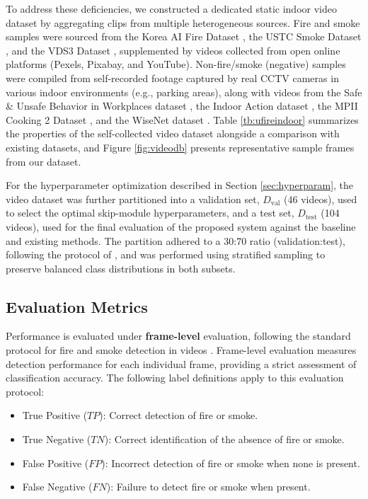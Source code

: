 \documentclass[
  10pt,
]{article}
\providecommand{\tightlist}{%
  \setlength{\itemsep}{0pt}\setlength{\parskip}{0pt}}
\begin{document}
To address these deficiencies, we constructed a dedicated static indoor
video dataset by aggregating clips from multiple heterogeneous sources.
Fire and smoke samples were sourced from the Korea AI Fire Dataset
, the USTC Smoke Dataset
, and the VDS3 Dataset
, supplemented by videos collected
from open online platforms (Pexels, Pixabay, and YouTube).
Non-fire/smoke (negative) samples were compiled from self-recorded
footage captured by real CCTV cameras in various indoor environments
(e.g., parking areas), along with videos from the Safe \& Unsafe
Behavior in Workplaces dataset ,
the Indoor Action dataset ,
the MPII Cooking 2 Dataset
, and the WiseNet
dataset . Table
\ref{tb:ufireindoor} summarizes the properties of the self-collected
video dataset alongside a comparison with existing datasets, and Figure
\ref{fig:videodb} presents representative sample frames from our
dataset.

For the hyperparameter optimization described in Section
\ref{sec:hyperparam}, the video dataset was further partitioned into a
validation set, \(D_{\text{val}}\) (46 videos), used to select the
optimal skip-module hyperparameters, and a test set, \(D_{\text{test}}\)
(104 videos), used for the final evaluation of the proposed system
against the baseline and existing methods. The partition adhered to a
30:70 ratio (validation:test), following the protocol of
, and was performed using
stratified sampling to preserve balanced class distributions in both
subsets.

\subsection{Evaluation Metrics}\label{sec:metrics}

Performance is evaluated under \textbf{frame-level} evaluation,
following the standard protocol for fire and smoke detection in videos
. Frame-level evaluation
measures detection performance for each individual frame, providing a
strict assessment of classification accuracy. The following label
definitions apply to this evaluation protocol:

\begin{itemize}
\tightlist
\item
  True Positive (\(TP\)): Correct detection of fire or smoke.
\item
  True Negative (\(TN\)): Correct identification of the absence of fire
  or smoke.
\item
  False Positive (\(FP\)): Incorrect detection of fire or smoke when
  none is present.
\item
  False Negative (\(FN\)): Failure to detect fire or smoke when present.
\end{itemize}
\end{document}

